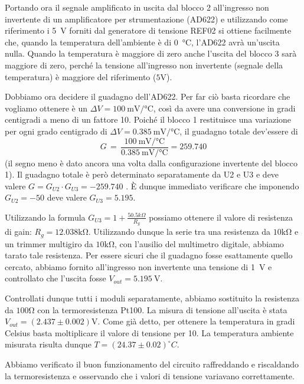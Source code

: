Portando ora il segnale amplificato in uscita dal blocco 2 all'ingresso non invertente di un amplificatore per strumentazione (AD622) e utilizzando come riferimento i \SI{5}{\volt} forniti dal generatore di tensione REF02 si ottiene facilmente che, quando la temperatura dell'ambiente è di \SI{0}{\celsius}, l'AD622 avrà un'uscita nulla.
Quando la temperatura è maggiore di zero anche l'uscita del blocco 3 sarà maggiore di zero, perché la tensione all'ingresso non invertente (segnale della temperatura) è maggiore del riferimento ($5\si{\volt}$).

Dobbiamo ora decidere il guadagno dell'AD622.
Per far ciò basta ricordare che vogliamo ottenere è un $\Delta V=\SI{100}{\milli\volt}/\si{\celsius}$, così da avere una conversione in gradi centigradi a meno di un fattore 10.
Poiché il blocco 1 restituisce una variazione per ogni grado centigrado di $\Delta V=\SI{0.385}{\milli\volt}/\si{\celsius}$, il guadagno totale dev'essere di
$$G\,=\,\frac{\SI{100}{\milli\volt}/\si{\celsius}}{\SI{0.385}{\milli\volt}/\si{\celsius}}=\num{259.740}$$
(il segno meno è dato ancora una volta dalla configurazione invertente del blocco 1).
Il guadagno totale è però determinato separatamente da U2 e U3 e deve valere $G= G_{U2}\cdot G_{U3}=-259.740$ .
È dunque immediato verificare che imponendo $G_{U2}=-50$ deve valere $G_{U3}=5.195$.

Utilizzando la formula $G_{U3}=1+\frac{50.5k\Omega}{R_g}$ possiamo ottenere il valore di resistenza di gain: $R_g=12.038\si{\kilo\ohm}$.
Utilizzando dunque la serie tra una resistenza da $10\si{\kilo\ohm}$ e un trimmer multigiro da $10\si{\kilo\ohm}$, con l'ausilio del multimetro digitale, abbiamo tarato tale resistenza. 
Per essere sicuri che il guadagno fosse esattamente quello cercato, abbiamo fornito all'ingresso non invertente una tensione di \SI{1}{\volt} e controllato che l'uscita fosse $V_{out}=\SI{5.195}{\V}$. 

Controllati dunque tutti i moduli separatamente, abbiamo sostituito la resistenza da $100\si{\ohm}$ con la termoresistenza Pt100.
La misura di tensione all'uscita è stata $V_{out}=(2.437\pm 0.002)\si{\volt}$.
Come già detto, per ottenere la temperatura in gradi Celsius basta moltiplicare il valore di tensione per 10.
La temperatura ambiente misurata risulta dunque $T=(24.37\pm0.02)^{\circ}C$.

Abbiamo verificato il buon funzionamento del circuito raffreddando e riscaldando la termoresistenza e osservando che i valori di tensione variavano correttamente.

